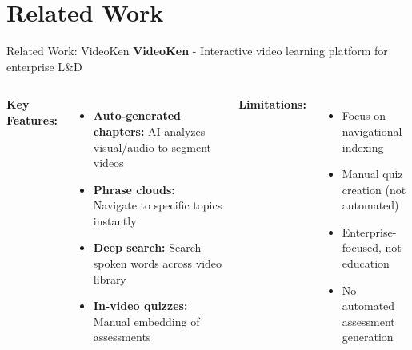 \documentclass{beamer}
\begin{document}
\section{Related Work}

\begin{frame}{Related Work: VideoKen}
    \textbf{VideoKen} - Interactive video learning platform for enterprise L\&D
    
    \begin{columns}
        \textbf{Key Features:}
        \begin{itemize}
            \item \textbf{Auto-generated chapters:} AI analyzes visual/audio to segment videos
            \item \textbf{Phrase clouds:} Navigate to specific topics instantly
            \item \textbf{Deep search:} Search spoken words across video library
            \item \textbf{In-video quizzes:} Manual embedding of assessments
        \end{itemize}
        
        \textbf{Limitations:}
        \begin{itemize}
            \item Focus on navigational indexing
            \item Manual quiz creation (not automated)
            \item Enterprise-focused, not education
            \item No automated assessment generation
        \end{itemize}
    \end{columns}
\end{frame}
\end{document}
